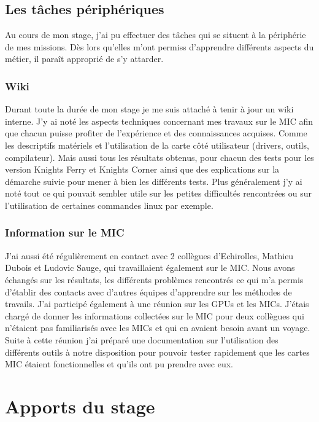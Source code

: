 \documentclass[11pt]{article}
\begin{document}
		\subsection{Les tâches périphériques}
		Au cours de mon stage, j’ai pu effectuer des tâches qui se situent à la périphérie de mes missions. Dès lors qu’elles 
		m’ont permiss d’apprendre différents aspects du métier, il paraît approprié de s’y attarder.
			\subsubsection{Wiki}
			Durant toute la durée de mon stage je me suis attaché à tenir à jour un wiki interne. J'y ai noté les aspects techniques 
			concernant mes travaux sur le MIC afin que chacun puisse profiter de l'expérience et des connaissances acquises. 
			Comme les descriptifs matériels et l'utilisation de la carte côté utilisateur (drivers, outils, compilateur).
			Mais aussi tous les résultats obtenus, pour chacun des tests pour les version Knights Ferry et Knights Corner ainsi 
			que des explications sur la démarche suivie pour mener à bien les différents tests. \newline
			Plus généralement j'y ai noté tout ce qui pouvait sembler utile sur les petites difficultés rencontrées ou sur l'utilisation 
			de certaines commandes linux par exemple.
			\subsubsection{Information sur le MIC}
			J'ai aussi été régulièrement en contact avec 2 collègues d'Echirolles, Mathieu Dubois et Ludovic Sauge, qui travaillaient également sur 
			le MIC. Nous avons échangés sur les résultats, les différents problèmes rencontrés ce qui m'a permis d'établir des contacts avec d'autres équipes 
			d'apprendre sur les méthodes de travails. \newline
			J'ai participé également à une réunion sur les GPUs et les MICs. J'étais chargé de donner les informations collectées sur le MIC pour 
			deux collègues qui n'étaient pas familiarisés avec les MICs et qui en avaient besoin avant un voyage. Suite à cette réunion j'ai préparé une documentation sur l'utilisation des différents outils à notre disposition 
			pour pouvoir tester rapidement que les cartes MIC étaient fonctionnelles et qu'ils ont pu prendre avec eux.
	\section{Apports du stage}
\end{document}
